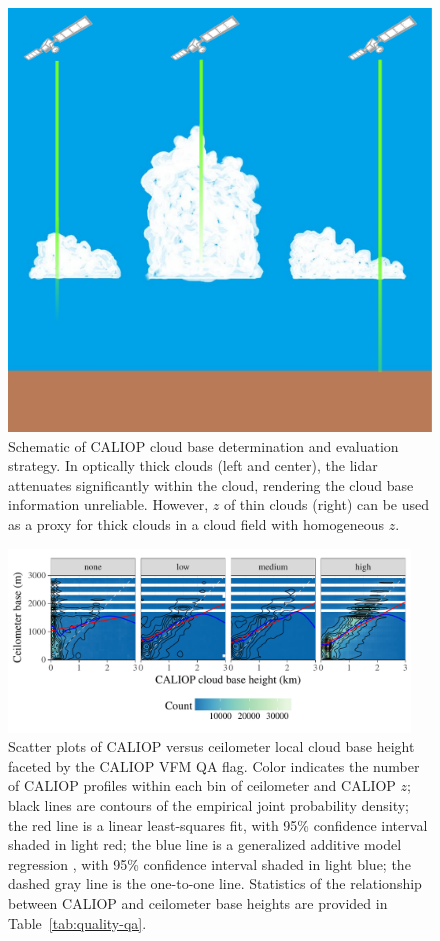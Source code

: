 \documentclass[essd,manuscript]{copernicus}\usepackage[]{graphicx}\usepackage[]{color}
\newenvironment{knitrout}{}{} %
\newcommand\CBH{\ensuremath{z}}
\begin{document}
\begin{figure}
  \centering
  \includegraphics[width=0.5\linewidth,keepaspectratio=true]{CloudFieldCALIOP.pdf}
  \caption{Schematic of CALIOP cloud base determination and evaluation strategy.
    In optically thick clouds (left and center), the lidar attenuates
    significantly within the cloud, rendering the cloud base information
    unreliable.  However, \CBH{} of thin clouds (right) can be used as a proxy
    for thick clouds in a cloud field with homogeneous \CBH{}.}
  \label{fig:method}
\end{figure}

\begin{figure}
  \centering
\begin{knitrout}
\color{fgcolor}

{\centering \includegraphics[width=0.95\textwidth]{figure/method-eval-qual-1} 

}



\end{knitrout}
  \caption{Scatter plots of CALIOP versus ceilometer local cloud base height
    faceted by the CALIOP VFM QA flag.  Color indicates the number of CALIOP
    profiles within each bin of ceilometer and CALIOP \CBH{}; black
    lines are contours of the empirical joint probability density; the red line
    is a linear least-squares fit, with 95\% confidence interval shaded in light
    red; the blue line is a generalized additive model regression
    \citep{Wood2011}, with 95\% confidence interval shaded in light
    blue; the dashed gray line is the one-to-one line.  Statistics of the
    relationship between CALIOP and ceilometer base heights are provided in
    Table~\ref{tab:quality-qa}.}
  \label{fig:quality-qa}
\end{figure}
\end{document}
